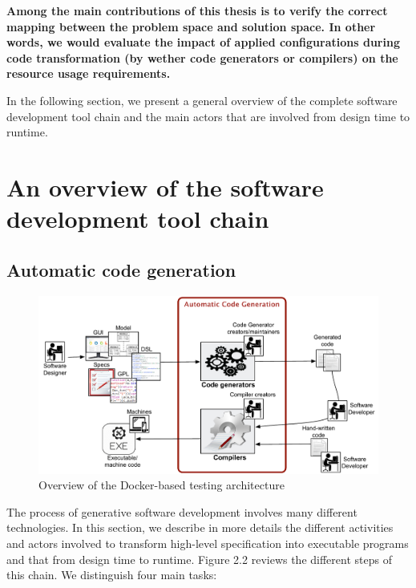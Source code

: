\textbf{Among the main contributions of this thesis is to verify the correct mapping between the problem space and solution space. In other words, we would evaluate the impact of applied configurations during code transformation (by wether code generators or compilers) on the resource usage requirements.
}

In the following section, we present a general overview of the complete software development tool chain and the main actors that are involved from design time to runtime.


\section{An overview of the software development tool chain}
\subsection{Automatic code generation}
\begin{figure}[h]
	\center
	\includegraphics[scale=0.65]{Background/fig/background_overview2.pdf}
	\caption{Overview of the Docker-based testing architecture}
\end{figure}
The process of generative software development involves many different technologies. In this section, we describe in more details the different activities and actors involved to transform high-level specification into executable programs and that from design time to runtime. 
Figure 2.2 reviews the different steps of this chain. We distinguish four main tasks: 
